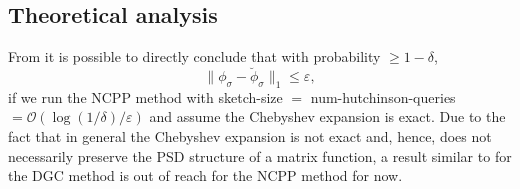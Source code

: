 
\subsection{Theoretical analysis}
\label{subsec:4-nystromchebyshev-analysis}

From  it is possible
to directly conclude that with probability $\geq 1-\delta$,
\begin{equation}
    \lVert \phi_{\sigma} - \breve{\phi}_{\sigma} \rVert _1 \leq \varepsilon,
    \label{equ:4-nystromchebyshev-spectral-density-error}
\end{equation}
if we run the \gls{NCPP} method with \gls{sketch-size} $=$ \gls{num-hutchinson-queries} $= \mathcal{O}(\log(1/\delta)/\varepsilon)$
and assume the Chebyshev expansion is exact. Due to the fact that in general the Chebyshev
expansion is not exact and, hence, does not necessarily preserve the \gls{PSD} structure of a matrix function,
a result similar to  for the \gls{DGC} method
is out of reach for the \gls{NCPP} method for now.


